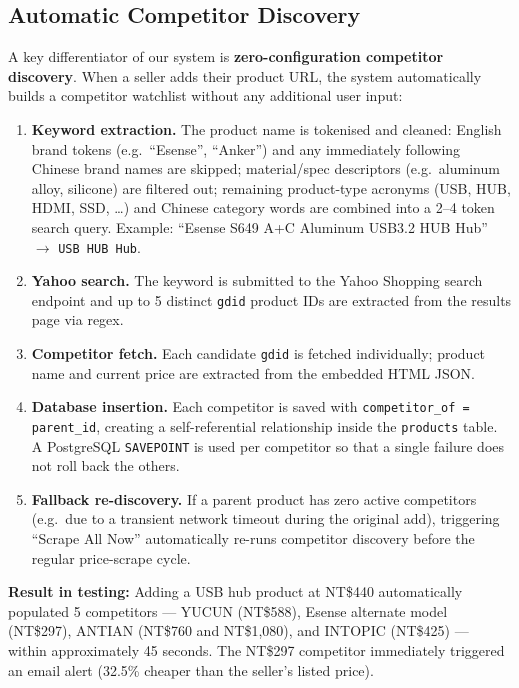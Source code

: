 \documentclass[11pt,a4paper]{article}
\begin{document}
\subsection{Automatic Competitor Discovery}

A key differentiator of our system is \textbf{zero-configuration competitor
discovery}. When a seller adds their product URL, the system automatically
builds a competitor watchlist without any additional user input:

\begin{enumerate}
  \item \textbf{Keyword extraction.} The product name is tokenised and cleaned:
        English brand tokens (e.g.\ ``Esense'', ``Anker'') and any immediately
        following Chinese brand names are skipped; material/spec descriptors
        (e.g.\ aluminum alloy, silicone) are filtered out; remaining
        product-type acronyms (USB, HUB, HDMI, SSD, \ldots) and Chinese
        category words are combined into a 2--4 token search query.
        Example: ``Esense S649 A+C Aluminum USB3.2 HUB Hub'' $\to$ \texttt{USB HUB Hub}.
  \item \textbf{Yahoo search.} The keyword is submitted to the Yahoo Shopping
        search endpoint and up to 5 distinct \texttt{gdid} product IDs are
        extracted from the results page via regex.
  \item \textbf{Competitor fetch.} Each candidate \texttt{gdid} is fetched
        individually; product name and current price are extracted from the
        embedded HTML JSON.
  \item \textbf{Database insertion.} Each competitor is saved with
        \texttt{competitor\_of = parent\_id}, creating a self-referential
        relationship inside the \texttt{products} table.
        A PostgreSQL \texttt{SAVEPOINT} is used per competitor so that a
        single failure does not roll back the others.
  \item \textbf{Fallback re-discovery.} If a parent product has zero active
        competitors (e.g.\ due to a transient network timeout during the
        original add), triggering ``Scrape All Now'' automatically re-runs
        competitor discovery before the regular price-scrape cycle.
\end{enumerate}

\begin{successbox}
\textbf{Result in testing:} Adding a USB hub product at NT\$440 automatically
populated 5 competitors --- YUCUN (NT\$588), Esense alternate model (NT\$297),
ANTIAN (NT\$760 and NT\$1,080), and INTOPIC (NT\$425) --- within approximately
45 seconds. The NT\$297 competitor immediately triggered an email alert
(32.5\% cheaper than the seller's listed price).
\end{successbox}
\end{document}
